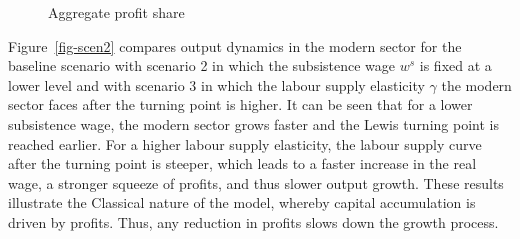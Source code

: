 \documentclass[
  letterpaper,
  DIV=11,
  numbers=noendperiod]{scrreprt}
\begin{document}
\begin{figure}[H]


\caption{\label{fig-profshare}Aggregate profit share}

\end{figure}%

Figure~\ref{fig-scen2} compares output dynamics in the modern sector for
the baseline scenario with scenario 2 in which the subsistence wage
\(w^s\) is fixed at a lower level and with scenario 3 in which the
labour supply elasticity \(\gamma\) the modern sector faces after the
turning point is higher. It can be seen that for a lower subsistence
wage, the modern sector grows faster and the Lewis turning point is
reached earlier. For a higher labour supply elasticity, the labour
supply curve after the turning point is steeper, which leads to a faster
increase in the real wage, a stronger squeeze of profits, and thus
slower output growth. These results illustrate the Classical nature of
the model, whereby capital accumulation is driven by profits. Thus, any
reduction in profits slows down the growth process.
\end{document}
